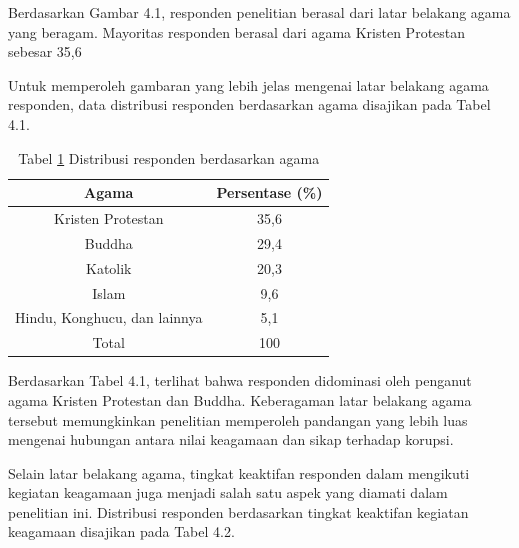 Berdasarkan Gambar 4.1, responden penelitian berasal dari latar belakang agama yang beragam. Mayoritas responden berasal dari agama Kristen Protestan sebesar 35,6%
        
Untuk memperoleh gambaran yang lebih jelas mengenai latar belakang agama responden, data distribusi responden berdasarkan agama disajikan pada Tabel 4.1.

\begin{table}[H]
\centering
\captionsetup{labelformat=empty}
\caption[Distribusi Responden Berdasarkan Agama]{Tabel \ref{tab:Tabelagama} Distribusi responden berdasarkan agama}
\label{tab:Tabelagama}
\begin{tabular}{ |c|c| } 
\hline
\textbf{Agama} & \textbf{Persentase (\%)} \\
\hline
Kristen Protestan & 35,6 \\ 
\hline
Buddha & 29,4 \\
\hline
Katolik & 20,3 \\
\hline
Islam & 9,6 \\
\hline
Hindu, Konghucu, dan lainnya & 5,1 \\
\hline
Total & 100\\
 
\hline
\end{tabular}
\end{table}

  
Berdasarkan Tabel 4.1, terlihat bahwa responden didominasi oleh penganut agama Kristen Protestan dan Buddha. Keberagaman latar belakang agama tersebut memungkinkan penelitian memperoleh pandangan yang lebih luas mengenai hubungan antara nilai keagamaan dan sikap terhadap korupsi.

Selain latar belakang agama, tingkat keaktifan responden dalam mengikuti kegiatan keagamaan juga menjadi salah satu aspek yang diamati dalam penelitian ini. Distribusi responden berdasarkan tingkat keaktifan kegiatan keagamaan disajikan pada Tabel 4.2. 

